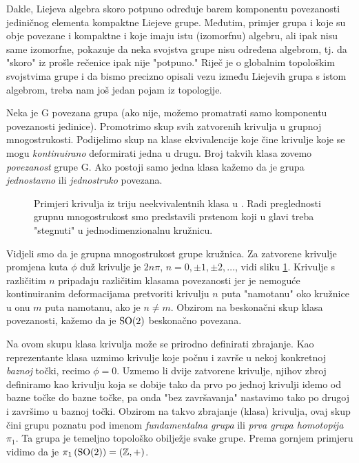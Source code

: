 Dakle, Liejeva algebra skoro potpuno određuje barem komponentu povezanosti
jediničnog elementa kompaktne Liejeve grupe.
Međutim, primjer grupa  i  koje su obje povezane i kompaktne i koje
imaju istu (izomorfnu) algebru, ali ipak nisu same izomorfne, pokazuje
da neka svojstva grupe nisu određena algebrom, tj. da "skoro" iz
prošle rečenice ipak nije "potpuno."
Riječ je o globalnim topološkim svojstvima grupe i
da bismo precizno opisali vezu između Liejevih grupa s istom algebrom, treba
nam još jedan pojam iz topologije.
\begin{definicija}
  Neka je G povezana grupa (ako nije, možemo promatrati samo komponentu
povezanosti jedinice). Promotrimo skup svih zatvorenih krivulja u grupnoj 
mnogostrukosti. Podijelimo skup  na klase ekvivalencije koje čine 
krivulje koje se mogu \emph{kontinuirano} deformirati jedna u drugu.
Broj takvih klasa zovemo \emph{povezanost} grupe G. Ako postoji samo
jedna klasa kažemo da je grupa \emph{jednostavno} ili \emph{jednostruko}
povezana.
\end{definicija}
\begin{figure}[htpb]
\centerline{}
\caption{Primjeri krivulja iz triju neekvivalentnih klasa u . Radi preglednosti
  grupnu mnogostrukost smo predstavili prstenom koji u glavi treba "stegnuti" u
   jednodimenzionalnu kružnicu.}
    \label{fig:so2homo}
\end{figure}
\begin{primjer}[\SO{2}] 
Vidjeli smo da je grupna
mnogostrukost grupe  kružnica.
Za zatvorene krivulje promjena kuta $\phi$ duž krivulje je $2n\pi$,
$n=0,\pm 1, \pm 2, \ldots$, vidi sliku \ref{fig:so2homo}. Krivulje s različitim $n$ pripadaju
različitim klasama povezanosti jer je nemoguće kontinuiranim deformacijama
pretvoriti krivulju $n$ puta "namotanu" oko kružnice u onu $m$ puta namotanu,
ako je $n \neq m$. Obzirom na beskonačni skup klasa povezanosti,
kažemo da je $\mathrm{SO}(2)$ beskonačno povezana.
\end{primjer}
Na ovom skupu klasa krivulja može se prirodno
definirati zbrajanje. Kao reprezentante klasa uzmimo
krivulje koje počnu i završe u nekoj konkretnoj \emph{baznoj} točki, recimo $\phi=0$.
Uzmemo li dvije zatvorene krivulje, njihov zbroj definiramo kao krivulju koja se dobije tako da 
prvo po jednoj krivulji idemo od bazne točke do bazne točke, pa onda
"bez završavanja" nastavimo tako po drugoj i završimo u baznoj točki.
Obzirom na takvo zbrajanje (klasa) krivulja, ovaj skup čini grupu
poznatu pod imenom \emph{fundamentalna grupa} ili \emph{prva grupa homotopija} $\pi_1$. 
 
Ta grupa je temeljno topološko obilježje svake grupe. Prema gornjem
primjeru vidimo da je $\pi_1\left(\mathrm{SO}(2) \right) = (\mathbb{Z}, +)$.

